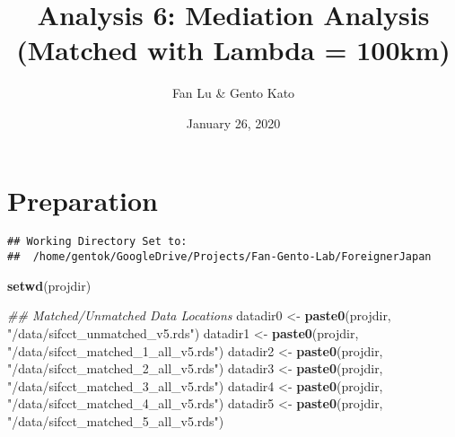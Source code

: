\documentclass[
]{article}
\title{Analysis 6: Mediation Analysis (Matched with Lambda = 100km)}
\author{Fan Lu \& Gento Kato}
\date{January 26, 2020}
\newenvironment{Shaded}{\begin{snugshade}}{\end{snugshade}}
\newcommand{\CharTok}[1]{\textcolor[rgb]{0.31,0.60,0.02}{#1}}
\newcommand{\CommentTok}[1]{\textcolor[rgb]{0.56,0.35,0.01}{\textit{#1}}}
\newcommand{\ControlFlowTok}[1]{\textcolor[rgb]{0.13,0.29,0.53}{\textbf{#1}}}
\newcommand{\DataTypeTok}[1]{\textcolor[rgb]{0.13,0.29,0.53}{#1}}
\newcommand{\KeywordTok}[1]{\textcolor[rgb]{0.13,0.29,0.53}{\textbf{#1}}}
\newcommand{\NormalTok}[1]{#1}
\newcommand{\OperatorTok}[1]{\textcolor[rgb]{0.81,0.36,0.00}{\textbf{#1}}}
\newcommand{\OtherTok}[1]{\textcolor[rgb]{0.56,0.35,0.01}{#1}}
\newcommand{\StringTok}[1]{\textcolor[rgb]{0.31,0.60,0.02}{#1}}
\begin{document}
\maketitle

\hypertarget{preparation}{%
\section{Preparation}\label{preparation}}

\begin{Shaded}
\end{Shaded}

\begin{verbatim}
## Working Directory Set to:
##  /home/gentok/GoogleDrive/Projects/Fan-Gento-Lab/ForeignerJapan
\end{verbatim}

\begin{Shaded}
\begin{Highlighting}[]
\KeywordTok{setwd}\NormalTok{(projdir)}

\CommentTok{## Matched/Unmatched Data Locations}
\NormalTok{datadir0 <-}\StringTok{ }\KeywordTok{paste0}\NormalTok{(projdir, }\StringTok{"/data/sifcct_unmatched_v5.rds"}\NormalTok{)}
\NormalTok{datadir1 <-}\StringTok{ }\KeywordTok{paste0}\NormalTok{(projdir, }\StringTok{"/data/sifcct_matched_1_all_v5.rds"}\NormalTok{)}
\NormalTok{datadir2 <-}\StringTok{ }\KeywordTok{paste0}\NormalTok{(projdir, }\StringTok{"/data/sifcct_matched_2_all_v5.rds"}\NormalTok{)}
\NormalTok{datadir3 <-}\StringTok{ }\KeywordTok{paste0}\NormalTok{(projdir, }\StringTok{"/data/sifcct_matched_3_all_v5.rds"}\NormalTok{)}
\NormalTok{datadir4 <-}\StringTok{ }\KeywordTok{paste0}\NormalTok{(projdir, }\StringTok{"/data/sifcct_matched_4_all_v5.rds"}\NormalTok{)}
\NormalTok{datadir5 <-}\StringTok{ }\KeywordTok{paste0}\NormalTok{(projdir, }\StringTok{"/data/sifcct_matched_5_all_v5.rds"}\NormalTok{)}
\end{Highlighting}
\end{Shaded}
\end{document}
